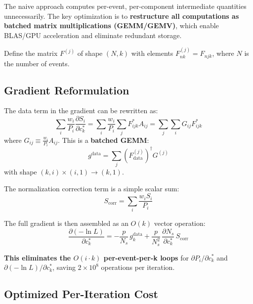 \documentclass[11pt,a4paper]{article}
\begin{document}
The naive approach computes per-event, per-component intermediate quantities unnecessarily. The key optimization is to \textbf{restructure all computations as batched matrix multiplications (GEMM/GEMV)}, which enable BLAS/GPU acceleration and eliminate redundant storage.

Define the matrix $F^{(j)}$ of shape $(N, k)$ with elements $F^{(j)}_{nk} = F_{njk}$, where $N$ is the number of events.

\subsection{Gradient Reformulation}

The data term in the gradient can be rewritten as:
\begin{equation}
\sum_i \frac{w_i}{P_i} \frac{\partial S_i}{\partial c_k^*} = \sum_i \frac{w_i}{P_i} \sum_j F_{ijk}^* A_{ij} = \sum_j \sum_i G_{ij} F_{ijk}^*
\end{equation}
where $G_{ij} \equiv \frac{w_i}{P_i} A_{ij}$. This is a \textbf{batched GEMM}:
\begin{equation}
g^{\text{data}} = \sum_j \left(F_{\text{data}}^{(j)}\right)^\dagger G^{(j)}
\end{equation}
with shape $(k, i) \times (i, 1) \to (k, 1)$.

The normalization correction term is a simple scalar sum:
\begin{equation}
S_{\text{corr}} = \sum_i \frac{w_i S_i}{P_i}
\end{equation}

The full gradient is then assembled as an $O(k)$ vector operation:
\begin{equation}
\frac{\partial(-\ln L)}{\partial c_k^*} = -\frac{p}{N_s} \, g_k^{\text{data}} + \frac{p}{N_s^2} \, \frac{\partial N_s}{\partial c_k^*} \, S_{\text{corr}}
\end{equation}

\textbf{This eliminates the $O(i \cdot k)$ per-event-per-k loops} for $\partial P_i/\partial c_k^*$ and $\partial(-\ln L)/\partial c_k^*$, saving $2 \times 10^8$ operations per iteration.

\subsection{Optimized Per-Iteration Cost}
\end{document}
